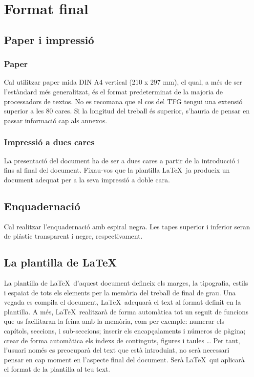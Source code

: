 
\chapter{Format final}

\section{Paper i impressió}

\subsection{Paper}

Cal utilitzar paper mida DIN A4 vertical (210 x 297 mm), el qual, a més de ser l'estàndard més generalitzat, és el format predeterminat de
la majoria de processadors de textos. No es recomana que el cos del TFG tengui una extensió superior a les 80 cares. Si la longitud del
treball és superior, s'hauria de pensar en passar informació cap als annexos.

\subsection{Impressió a dues cares}

La presentació del document ha de ser a dues cares a partir de la introducció i fins al final del document. Fixau-vos que la plantilla
\LaTeX\ ja produeix un document adequat per a la seva impressió a doble cara.

\section{Enquadernació}

Cal realitzar l'enquadernació amb espiral negra. Les tapes superior i inferior seran de plàstic transparent i negre, respectivament.

\section{La plantilla de \LaTeX}

La plantilla de \LaTeX\ d'aquest document defineix els marges, la tipografia, estils i espaiat de tots els elements per la memòria del treball de final de
grau. Una vegada es compila el document, \LaTeX\  adequarà el text al format definit en la plantilla. A més, \LaTeX\ realitzarà de forma
automàtica tot un seguit de funcions que us facilitaran la feina amb la memòria, com per exemple: numerar els capítols, seccions, i
sub-seccions; inserir els encapçalaments i números de pàgina; crear de forma automàtica els índexs de continguts, figures i taules \dots
Per tant, l'usuari només es preocuparà del text que està introduint, no serà necessari pensar en cap moment en l'aspecte final del
document. Serà \LaTeX\ qui aplicarà el format de la plantilla al teu text.

